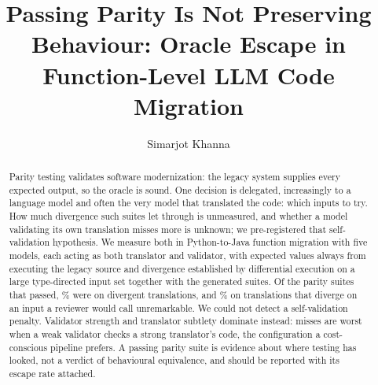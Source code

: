 \documentclass[sigconf]{acmart}
\begin{document}
\title{Passing Parity Is Not Preserving Behaviour: Oracle Escape in
       Function-Level LLM Code Migration}

\author{Simarjot Khanna}

\begin{abstract}
Parity testing validates software modernization: the legacy system supplies every expected
output, so the oracle is sound. One decision is delegated, increasingly to a language model and
often the very model that translated the code: which inputs to try. How much divergence such
suites let through is unmeasured, and whether a model validating its own translation misses
more is unknown; we pre-registered that self-validation hypothesis. We measure both in
Python-to-Java function migration with five models, each acting as both translator and
validator, with expected values always from executing the legacy source and divergence
established by differential execution on a large type-directed input set together with the
generated suites. Of the parity suites that passed, \EscapeRate\% were on divergent
translations, and \EscapeOrdinary\% on translations that diverge on an input a reviewer would
call unremarkable. We could not detect a self-validation penalty. Validator strength and translator
subtlety dominate instead: misses are worst when a weak validator checks a strong translator's
code, the configuration a cost-conscious pipeline prefers. A passing parity suite is evidence
about where testing has looked, not a verdict of behavioural equivalence, and should be
reported with its escape rate attached.
\end{abstract}


\maketitle
\end{document}

